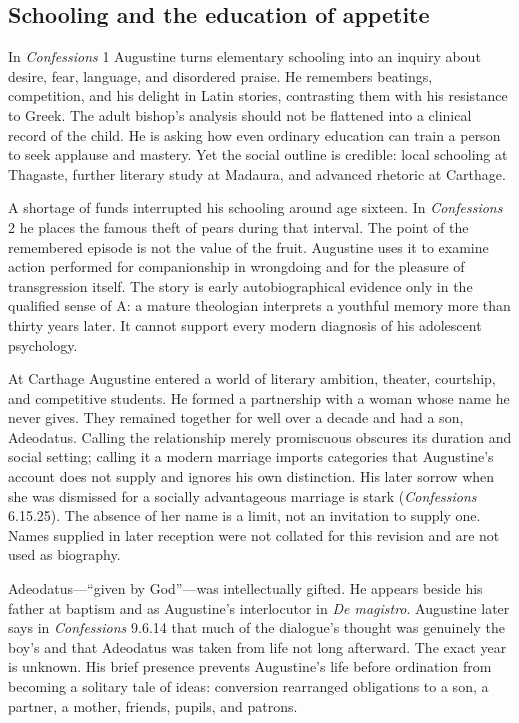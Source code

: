 \subsection{Schooling and the education of appetite}

In \emph{Confessions} 1 Augustine turns elementary schooling into an inquiry
about desire, fear, language, and disordered praise. He remembers beatings,
competition, and his delight in Latin stories, contrasting them with his
resistance to Greek. The adult bishop's analysis should not be flattened into
a clinical record of the child. He is asking how even ordinary education can
train a person to seek applause and mastery. Yet the social outline is
credible: local schooling at Thagaste, further literary study at Madaura, and
advanced rhetoric at Carthage.

A shortage of funds interrupted his schooling around age sixteen. In
\emph{Confessions} 2 he places the famous theft of pears during that interval.
The point of the remembered episode is not the value of the fruit. Augustine
uses it to examine action performed for companionship in wrongdoing and for
the pleasure of transgression itself. The story is early autobiographical
evidence only in the qualified sense of A: a mature theologian interprets a
youthful memory more than thirty years later. It cannot support every modern
diagnosis of his adolescent psychology.

At Carthage Augustine entered a world of literary ambition, theater,
courtship, and competitive students. He formed a partnership with a woman
whose name he never gives. They remained together for well over a decade and
had a son, Adeodatus. Calling the relationship merely promiscuous obscures its
duration and social setting; calling it a modern marriage imports categories
that Augustine's account does not supply and ignores his own distinction.
His later sorrow when she was dismissed for a socially advantageous marriage
is stark (\emph{Confessions} 6.15.25). The absence of her name is a limit, not
an invitation to supply one. Names supplied in later reception were not
collated for this revision and are not used as biography.

Adeodatus---“given by God”---was intellectually gifted. He appears beside
his father at baptism and as Augustine's interlocutor in \emph{De magistro}.
Augustine later says in \emph{Confessions} 9.6.14 that much of the dialogue's
thought was genuinely the boy's and that Adeodatus was taken from life not
long afterward. The exact year is unknown. His brief presence prevents
Augustine's life before ordination from becoming a solitary tale of ideas:
conversion rearranged obligations to
a son, a partner, a mother, friends, pupils, and patrons.

